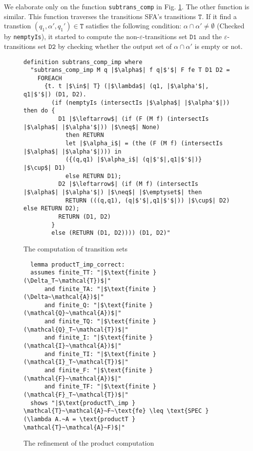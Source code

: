 \documentclass[a4paper,UKenglish,cleveref, autoref, thm-restate]{lipics-v2021}
\begin{document}
We elaborate only on the function \texttt{subtrans\_comp} in Fig. \ref{fig-def-subtrans_comp}. The other function is similar. 
This function traverses the transitions SFA's transitions $\texttt{T}$. If it find a transtion $(q_1, \alpha', q_1')\in \texttt{T}$ satisfies the following condition:
$\alpha \cap \alpha' \neq \emptyset$ (Checked by \texttt{nemptyIs}),
it started to compute the non-$\varepsilon$-transitions set $\texttt{D1}$ and the $\varepsilon$-transitions set $\texttt{D2}$ by checking whether the output set of $\alpha \cap \alpha'$ is empty or not.


\begin{figure}[hbt!]
	\begin{lstlisting}
definition subtrans_comp_imp where
  "subtrans_comp_imp M q |$\alpha$| f q|$'$| F fe T D1 D2 =
    FOREACH
      {t. t |$\in$| T} (|$\lambda$| (q1, |$\alpha'$|, q1|$'$|) (D1, D2).
        (if (nemptyIs (intersectIs |$\alpha$| |$\alpha'$|)) then do {
          D1 |$\leftarrow$| (if (F (M f) (intersectIs |$\alpha$| |$\alpha'$|)) |$\neq$| None) 
            then RETURN 
            let |$\alpha_i$| = (the (F (M f) (intersectIs |$\alpha$| |$\alpha'$|))) in
            ({(q,q1) |$\alpha_i$| (q|$'$|,q1|$'$|)} |$\cup$| D1)
            else RETURN D1);
          D2 |$\leftarrow$| (if (M f) (intersectIs |$\alpha$| |$\alpha'$|) |$\neq$| |$\emptyset$| then 
            RETURN (((q,q1), (q|$'$|,q1|$'$|)) |$\cup$| D2) else RETURN D2);
          RETURN (D1, D2)
        }
        else (RETURN (D1, D2)))) (D1, D2)"
    \end{lstlisting}
    \caption{The computation of transition sets}
    \label{fig-def-subtrans_comp}
    \end{figure}


 

  \begin{figure}[hbt!]
    \begin{lstlisting}
  lemma productT_imp_correct:
  assumes finite_TT: "|$\text{finite } (\Delta_T~\mathcal{T})$|"    
      and finite_TA: "|$\text{finite } (\Delta~\mathcal{A})$|"
      and finite_Q: "|$\text{finite } (\mathcal{Q}~\mathcal{A})$|"
      and finite_TQ: "|$\text{finite } (\mathcal{Q}_T~\mathcal{T})$|"
      and finite_I: "|$\text{finite } (\mathcal{I}~\mathcal{A})$|"
      and finite_TI: "|$\text{finite } (\mathcal{I}_T~\mathcal{T})$|"
      and finite_F: "|$\text{finite } (\mathcal{F}~\mathcal{A})$|"
      and finite_TF: "|$\text{finite } (\mathcal{F}_T~\mathcal{T})$|"
  shows "|$\text{productT\_imp } \mathcal{T}~\mathcal{A}~F~\text{fe} \leq \text{SPEC } (\lambda A.~A = \text{productT } \mathcal{T}~\mathcal{A}~F)$|"
  \end{lstlisting}
  \caption{The refinement of the product computation}
  \label{fig-def-productT_imp_correct}
  \end{figure}
\end{document}

